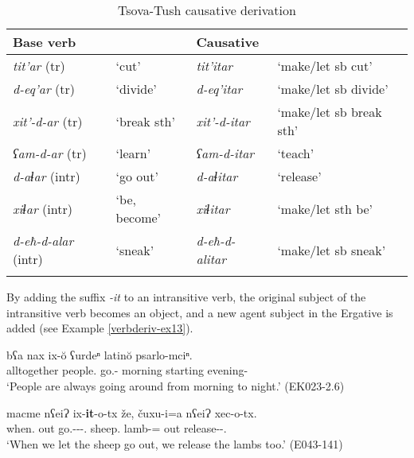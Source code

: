 \begin{table}
	\begin{tabular}{llll}
		\lsptoprule
		Base verb & & Causative & \\
        \midrule
		\textit{tit'ar} (tr) & `cut' & \textit{tit'itar} & `make/let sb cut' \\
		\textit{d-eq'ar} (tr) & `divide' & \textit{d-eq'itar} & `make/let sb divide' \\
		\textit{xit'-d-ar} (tr) & `break sth' & \textit{xit'-d-itar} & `make/let sb break sth' \\
		\textit{ʕam-d-ar} (tr) & `learn' & \textit{ʕam-d-itar} & `teach' \\
		\textit{d-aɬar} (intr) & `go out' & \textit{d-aɬitar} & `release' \\
		\textit{xiɬar} (intr) & `be, become' & \textit{xiɬitar} & `make/let sth be' \\
		\textit{d-eħ-d-alar} (intr) & `sneak' & \textit{d-eħ-d-alitar} & `make/let sb sneak' \\
		\lspbottomrule
	\end{tabular}
	\caption{Tsova-Tush causative derivation}
	\label{verbderiv-table5}
\end{table}





By adding the suffix \textit{-it} to an intransitive verb, the original subject of the intransitive verb becomes an object, and a new agent subject in the Ergative is added (see Example \ref{verbderiv-ex13}). 


\begin{exe}
	\ex\label{verbderiv-ex13}
	\begin{xlist}
		
		
			\ex\label{verbderiv-ex13a}
			\gll bʕa nax ix-\u{o} ʕurdeⁿ latin\u{o} psarlo-mciⁿ. \\
			alltogether people.{\Nom} go.{\Ipfv}-{\Npst} morning starting evening-{\Term} \\
			\trans `People are always going around from morning to night.'
			\hfill (EK023-2.6)
		
			\ex\label{verbderiv-ex13b}
			\gll macme nʕeiɁ ix-\textbf{it}-o-tx že, čuxu-i=a nʕeiɁ xec-o-tx. \\
			when.{\Rel} out go.{\Ipfv}-\textbf{{\Caus}}-{\Npst}-{\Fpl}.{\Erg} sheep.{\Nom} lamb-{\Pl}={\Add} out release-{\Npst}-{\Fpl}.{\Erg}\\
			\trans `When we let the sheep go out, we release the lambs too.'
			\hfill (E043-141)
		
		
	\end{xlist}
\end{exe}

